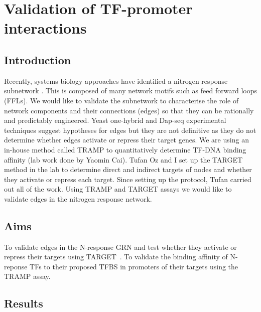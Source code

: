 \documentclass[../main.tex]{subfiles}
\begin{document}
\chapter{Validation of TF-promoter interactions}\label{chapter4}
\section{Introduction}\label{chapter4:introduction}
Recently, systems biology approaches have identified a nitrogen response subnetwork \autocite{gaudinierTranscriptionalRegulationNitrogenassociated2018}.
This is composed of many network motifs such as feed forward loops (FFLs).
We would like to validate the subnetwork to characterise the role of network components and their connections (edges) so that they can be rationally and predictably engineered.
Yeast one-hybrid and Dap-seq experimental techniques suggest hypotheses for edges but they are not definitive as they do not determine whether edges activate or repress their target genes.
We are using an in-house method called TRAMP to quantitatively determine TF-DNA binding affinity (lab work done by Yaomin Cai).
Tufan Oz and I set up the TARGET~\autocite{bargmannTARGETTransientTransformation2013} method in the lab to determine direct and indirect targets of nodes and whether they activate or repress each target. Since setting up the protocol, Tufan carried out all of the work.
Using TRAMP and TARGET assays we would like to validate edges in the nitrogen response network.
\section{Aims}\label{chapter4:aims}
To validate edges in the N-response GRN and test whether they activate or repress their targets using TARGET~\autocite{bargmannTARGETTransientTransformation2013}.
To validate the binding affinity of N-reponse TFs to their proposed TFBS in promoters of their targets using the TRAMP assay.
\section{Results}\label{chapter4:results}
\end{document}
